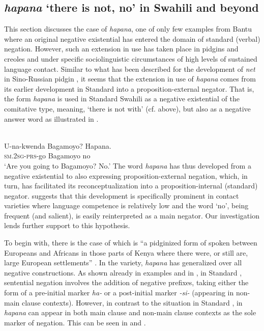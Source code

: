 \documentclass[output=paper,draft,draftmode,colorlinks,citecolor=brown]{langscibook}
\begin{document}
\subsection{\textit{hapana} `there is not, no' in Swahili and beyond}\label{sec:1:6.4}
%
This section discusses the case of \textit{hapana}, one of only few examples
from Bantu where an original negative existential has entered the
domain of standard (verbal) negation. However, such
an extension in use has taken place in pidgins and creoles and under
specific sociolinguistic circumstances of high levels of sustained
language contact. Similar to what has been described for the development of
 \textit{net} in Sino-Russian pidgin
\parencites{Veselinova2013}{Veselinova2016}, it seems that the extension in use
of \textit{hapana} comes from its earlier development in Standard
  into a pro\-po\-si\-tion-ex\-ter\-nal negator. That is, the form \textit{hapana} is used in Standard Swahili as a negative existential of the comitative type, meaning, `there is not with' (cf.  above), but also as a negative answer word as illustrated in .
%

\ea\label{ex:swahili-bagamoyo}
\\
\gll U-na-kwenda Bagamoyo? Hapana.\\
	\textsc{sm.2sg}-\textsc{prs}-go Bagamoyo no\\
\glt 	`Are you going to Bagamoyo? No.'
\z
%
The word \textit{hapana} has thus developed from a negative existential to
also expressing proposition-external negation, which, in turn, has
facilitated its reconceptualization into a proposition-internal (standard) negator. \textcites{Veselinova2013}{Veselinova2016} suggests that this
development is specifically prominent in contact varieties where language competence is relatively low and the word `no', being frequent
(and salient), is easily reinterpreted as a main negator. Our investigation
lends further support to this hypothesis.

To begin with, there is the case of  which is ``a pidginized
form of  spoken between Europeans and Africans in those parts
of Kenya where there were, or still are, large European settlements''
\parencite[51]{Vitale1980}. In the  variety, \textit{hapana} has
generalized over all negative constructions. As shown already in examples
 and  in , in
Standard , sentential negation
involves the addition of negative prefixes, taking either the form of a
pre-initial marker \textit{ha-} or a post-initial marker \textit{-si-}
(appearing in non-main clause contexts). However, in contrast to the
situation in Standard , in  \textit{hapana} can
appear in both main clause and non-main clause contexts as the sole marker
of negation. This can be seen in  and
.
\end{document}
